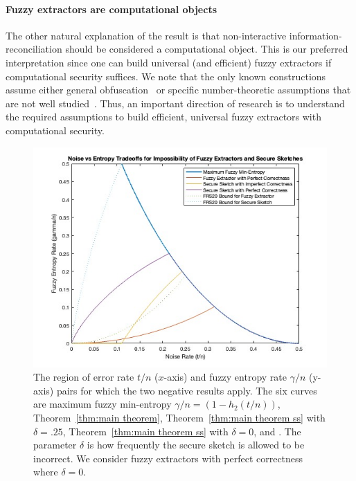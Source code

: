 \paragraph{Fuzzy extractors are computational objects} The other natural explanation of the result is that non-interactive information-reconciliation should be considered a computational object. This is our preferred interpretation since one can build universal (and efficient) fuzzy extractors if computational security suffices.  We note that the only known constructions assume either general obfuscation~\cite{BarakBCKPS13,BitanskyCKP14,bitansky2017virtual} or specific number-theoretic assumptions that are not well studied~\cite{galbraith2019obfuscated}. Thus, an important direction of research is to understand the required assumptions to build efficient, universal fuzzy extractors with computational security. 

\begin{figure}[t]
\centering
\includegraphics[width=.9\textwidth]{EntropyvsError.jpg}
\caption{The region of error rate $t/n$ ($x$-axis) and fuzzy entropy rate $\gamma/n$ (y-axis) pairs for which the two negative results apply.  The six curves are maximum fuzzy min-entropy $\gamma/n = (1-h_2(t/n))$, Theorem~\ref{thm:main theorem}, Theorem~\ref{thm:main theorem ss} with $\delta=.25$,  Theorem~\ref{thm:main theorem ss} with $\delta =0$, \cite[Theorem 5.1]{fuller2020fuzzy} and \cite[Theorem 7.2]{fuller2020fuzzy}. The parameter $\delta$ is how frequently the secure sketch is allowed to be incorrect.  We consider fuzzy extractors with perfect correctness where $\delta=0$.}
\label{fig:param regime}
\end{figure}

